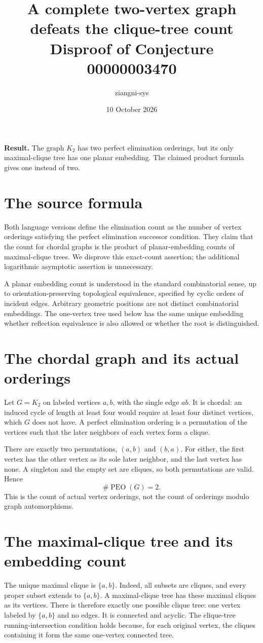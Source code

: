 \documentclass[11pt]{article}
\title{A complete two-vertex graph defeats the clique-tree count\\\large Disproof of Conjecture 00000003470}
\author{ziangni-sys}\date{10 October 2026}
\begin{document}
\maketitle
\noindent\textbf{Result.} The graph $K_2$ has two perfect elimination orderings, but its only maximal-clique tree has one planar embedding. The claimed product formula gives one instead of two.

\section*{The source formula}
Both language versions define the elimination count as the number of vertex orderings satisfying the perfect elimination successor condition. They claim that the count for chordal graphs is the product of planar-embedding counts of maximal-clique trees. We disprove this exact-count assertion; the additional logarithmic asymptotic assertion is unnecessary.

A planar embedding count is understood in the standard combinatorial sense, up to orientation-preserving topological equivalence, specified by cyclic orders of incident edges. Arbitrary geometric positions are not distinct combinatorial embeddings. The one-vertex tree used below has the same unique embedding whether reflection equivalence is also allowed or whether the root is distinguished.

\section*{The chordal graph and its actual orderings}
Let $G=K_2$ on labeled vertices $a,b$, with the single edge $ab$. It is chordal: an induced cycle of length at least four would require at least four distinct vertices, which $G$ does not have. A perfect elimination ordering is a permutation of the vertices such that the later neighbors of each vertex form a clique.

There are exactly two permutations, $(a,b)$ and $(b,a)$. For either, the first vertex has the other vertex as its sole later neighbor, and the last vertex has none. A singleton and the empty set are cliques, so both permutations are valid. Hence
\[
 \#\operatorname{PEO}(G)=2.
\]
This is the count of actual vertex orderings, not the count of orderings modulo graph automorphisms.

\section*{The maximal-clique tree and its embedding count}
The unique maximal clique is $\{a,b\}$. Indeed, all subsets are cliques, and every proper subset extends to $\{a,b\}$. A maximal-clique tree has these maximal cliques as its vertices. There is therefore exactly one possible clique tree: one vertex labeled by $\{a,b\}$ and no edges. It is connected and acyclic. The clique-tree running-intersection condition holds because, for each original vertex, the cliques containing it form the same one-vertex connected tree.
\end{document}
